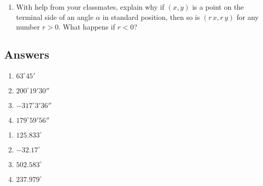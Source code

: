 \documentclass{ximera}
\begin{document}
\begin{enumerate}

\setcounter{enumi}{\value{HW}}

\item With help from your classmates, explain why if $(x,y)$ is a point on the terminal side of an angle $\alpha$ in standard position, then so is $(r\,x, r\,y)$ for any number $r > 0$.  What happens if $r < 0$?

\end{enumerate}

\newpage

\subsection{Answers}

\begin{multicols}{4}

\begin{enumerate}

\item $63^{\circ} 45'$
\item $200^{\circ} 19' 30''$
\item $-317^{\circ} 3' 36''$
\item $179^{\circ} 59' 56''$

\setcounter{HW}{\value{enumi}}

\end{enumerate}

\end{multicols}

\begin{multicols}{4}

\begin{enumerate}

\setcounter{enumi}{\value{HW}}

\item $125.833^{\circ}$
\item $-32.17^{\circ}$
\item $502.583^{\circ}$
\item $237.979^{\circ}$

\setcounter{HW}{\value{enumi}}

\end{enumerate}

\end{multicols}
\end{document}
